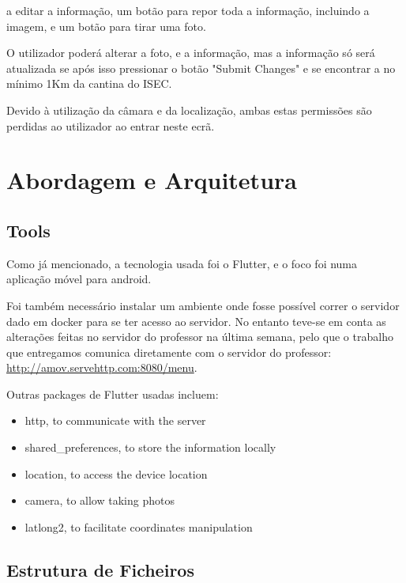 \documentclass[10pt]{article}
\begin{document}
a editar a informação, um botão para repor toda a informação, incluindo a imagem, e um botão para tirar uma foto.

    O utilizador poderá alterar a foto, e a informação, mas a informação só será atualizada se após isso pressionar o botão "Submit Changes" e se encontrar a no mínimo 1Km da cantina do ISEC.

    Devido à utilização da câmara e da localização, ambas estas permissões são perdidas ao utilizador ao entrar neste ecrã.

\section{Abordagem e Arquitetura}\label{sec:3}

	\subsection{Tools}

		Como já mencionado, a tecnologia usada foi o Flutter, e o foco foi numa aplicação móvel para android.

        Foi também necessário instalar um ambiente onde fosse possível correr o servidor dado em docker para se ter acesso ao servidor. No entanto teve-se em conta as alterações feitas no servidor do professor na última semana, pelo que o trabalho que entregamos comunica diretamente com o servidor do professor: \href{http://amov.servehttp.com:8080/menu}{http://amov.servehttp.com:8080/menu}.

        Outras packages de Flutter\cite{1} usadas incluem:

        \begin{itemize}
		\item http, to communicate with the server
		\item shared\_preferences, to store the information locally
		\item location, to access the device location
		\item camera, to allow taking photos
            \item latlong2, to facilitate coordinates manipulation
	\end{itemize}

    \pagebreak

        \subsection{Estrutura de Ficheiros}
\end{document}

